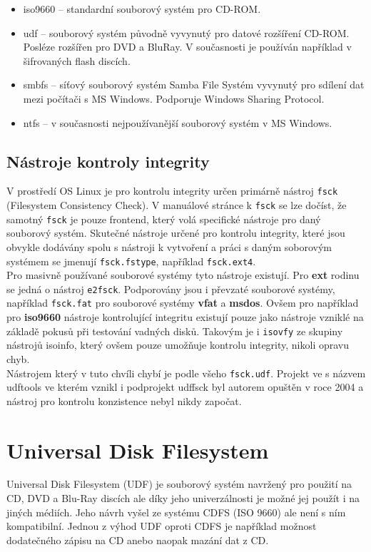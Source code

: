 \begin{itemize}
    \item iso9660 -- standardní souborový systém pro CD-ROM. 
    \item udf -- souborový systém původně vyvynutý pro datové rozšíření CD-ROM. Posléze rozšířen pro DVD a BluRay. V současnosti je používán například v šifrovaných flash discích. 
    \item smbfs -- síťový souborový systém Samba File Systém vyvynutý pro sdílení dat mezi počítači s MS Windows. Podporuje Windows Sharing Protocol.
    \item ntfs -- v současnosti nejpoužívanější souborový systém v MS Windows.
\end{itemize}

\section{Nástroje kontroly integrity}
V prostředí OS Linux je pro kontrolu integrity určen primárně nástroj \texttt{fsck} (Filesystem Consistency Check). V manuálové stránce k \texttt{fsck} \cite{man-fsck} se lze dočíst, že samotný \texttt{fsck} je pouze frontend, který volá specifické nástroje pro daný souborový systém. Skutečné nástroje určené pro kontrolu integrity, které jsou obvykle dodávány spolu s nástroji k vytvoření a práci s daným soborovým systémem se jmenují \texttt{fsck.fstype}, například \texttt{fsck.ext4}.\\
Pro masivně používané souborové systémy tyto nástroje existují. Pro \textbf{ext} rodinu se jedná o nástroj \texttt{e2fsck}. Podporovány jsou i převzaté souborové systémy, například \texttt{fsck.fat} pro souborové systémy \textbf{vfat} a \textbf{msdos}. Ovšem pro například pro \textbf{iso9660} nástroje kontrolující integritu existují pouze jako nástroje vzniklé na základě pokusů při testování vadných disků. Takovým je i \texttt{isovfy} \cite{man-isovfy} ze skupiny nástrojů isoinfo, který ovšem pouze umožňuje kontrolu integrity, nikoli opravu chyb.\\
Nástrojem který v tuto chvíli chybí je podle všeho \texttt{fsck.udf}. Projekt ve s názvem udftools \cite{udftools-sourceforge} ve kterém vznikl i podprojekt udffsck byl autorem opuštěn v roce 2004 a nástroj pro kontrolu konzistence nebyl nikdy započat. 

\chapter{Universal Disk Filesystem}
\label{sec:udf}
Universal Disk Filesystem (UDF) je souborový systém navržený pro použití na CD, DVD a Blu-Ray discích ale díky jeho univerzálnosti je možné jej použít i na jiných médiích. Jeho návrh vyšel ze systému CDFS (ISO 9660) ale není s ním kompatibilní. Jednou z výhod UDF oproti CDFS je například možnost dodatečného zápisu na CD anebo naopak mazání dat z CD. 

